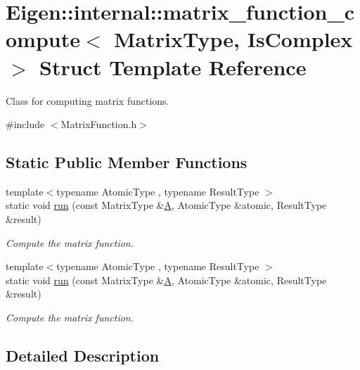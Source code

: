 \hypertarget{struct_eigen_1_1internal_1_1matrix__function__compute}{}\section{Eigen\+:\+:internal\+:\+:matrix\+\_\+function\+\_\+compute$<$ Matrix\+Type, Is\+Complex $>$ Struct Template Reference}
\label{struct_eigen_1_1internal_1_1matrix__function__compute}


Class for computing matrix functions.  




{\ttfamily \#include $<$Matrix\+Function.\+h$>$}

\subsection*{Static Public Member Functions}
\begin{DoxyCompactItemize}
\item 
{\footnotesize template$<$typename Atomic\+Type , typename Result\+Type $>$ }\\static void \hyperlink{struct_eigen_1_1internal_1_1matrix__function__compute_a55a328773f5254d0cd29ac699bc2634f}{run} (const Matrix\+Type \&\hyperlink{group___core___module_class_eigen_1_1_matrix}{A}, Atomic\+Type \&atomic, Result\+Type \&result)
\begin{DoxyCompactList}\small\item\em Compute the matrix function. \end{DoxyCompactList}\item 
{\footnotesize template$<$typename Atomic\+Type , typename Result\+Type $>$ }\\static void \hyperlink{struct_eigen_1_1internal_1_1matrix__function__compute_a55a328773f5254d0cd29ac699bc2634f}{run} (const Matrix\+Type \&\hyperlink{group___core___module_class_eigen_1_1_matrix}{A}, Atomic\+Type \&atomic, Result\+Type \&result)
\begin{DoxyCompactList}\small\item\em Compute the matrix function. \end{DoxyCompactList}\end{DoxyCompactItemize}


\subsection{Detailed Description}

